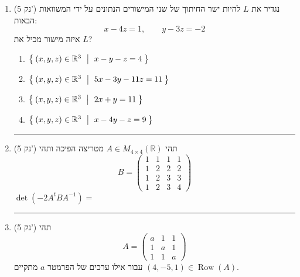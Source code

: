 \documentclass[12pt, a4paper]{article}
\newcommand{\rr}{\mathbb{R}}
\newcommand{\points}[1]{(#1 נק') }
\DeclareMathOperator{\row}{Row}
\begin{document}
\begin{enumerate}

\item\points{5}
נגדיר את $L$
להיות ישר החיתוך של שני המישורים הנתונים על ידי המשוואות הבאות:
\[
x-4z=1,\qquad
y-3z=-2
\]
איזה מישור מכיל את $L$?

\begin{enumerate}
\item $\Set{(x,y,z)\in \rr^3\ |\ x-y-z = 4}$
\item $\Set{(x,y,z)\in \rr^3\ |\ 5x-3y-11z=11}$
\item $\Set{(x,y,z)\in \rr^3\ |\ 2x+y=11}$
\item $\Set{(x,y,z)\in \rr^3\ |\ x-4y-z=9}$
\end{enumerate}

\noindent\rule{\textwidth-30pt}{0.4pt}


\item\points{5}
תהי 
$A\in M_{4\times 4}(\rr)$
מטריצה הפיכה ותהי
\[
B=
\begin{pmatrix}
    1 & 1 & 1 & 1 \\
    1 & 2 & 2 & 2 \\
    1 & 2 & 3 & 3 \\
    1 & 2 & 3 & 4
\end{pmatrix}
\]
$\det(-2A^tBA^{-1})=$
\begin{enumerate}
\end{enumerate}


\noindent\rule{\textwidth-30pt}{0.4pt}
\pagebreak

\item\points{5}
תהי
\[A=\begin{pmatrix}
    a & 1 & 1 \\
    1 & a & 1 \\
    1 & 1 & a
\end{pmatrix}\]
עבור אילו ערכים של הפרמטר 
$a$
מתקיים 
$(4,-5,1)\in\row(A)$.
\begin{enumerate}


\end{enumerate}
\end{enumerate}
\end{document}
